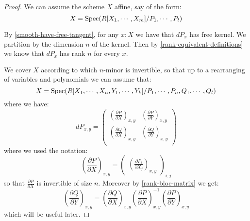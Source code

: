 \begin{proof}
We can assume the scheme $X$ affine, say of the form:
\[X = \operatorname{Spec}(R[X_1,\cdots,X_m]/P_1,\cdots,P_l)\]

By \cref{smooth-have-free-tangent}, for any $x:X$ we have that $dP_x$ has free kernel. We partition by the dimension $n$ of the kernel. Then by \cref{rank-equivalent-definitions} we know that $dP_x$ has rank $n$ for every $x$.

We cover $X$ according to which $n$-minor is invertible, so that up to a rearranging of variables and polynomials we can assume that:
\[X = \operatorname{Spec}(R[X_1,\cdots,X_n,Y_1,\cdots,Y_k]/P_1,\cdots,P_n,Q_1,\cdots, Q_l)\]
where we have:
\[dP_{x,y} = \begin{pmatrix}
\left(\frac{\partial P}{\partial X}\right)_{x,y} & \left(\frac{\partial P}{\partial Y}\right)_{x,y} \\
\left(\frac{\partial Q}{\partial X}\right)_{x,y} & \left(\frac{\partial Q}{\partial Y}\right)_{x,y} \\
\end{pmatrix}\]
where we used the notation:
\[\left(\frac{\partial P}{\partial X}\right)_{x,y} = \begin{pmatrix}\left(\frac{\partial P_i}{\partial X_j}\right)_{x,y}\end{pmatrix}_{i,j}\]
so that $\frac{\partial P}{\partial X}$ is invertible of size $n$. Moreover by \cref{rank-bloc-matrix} we get:
\[\left(\frac{\partial Q}{\partial Y}\right)_{x,y} = \left(\frac{\partial Q}{\partial X}\right)_{x,y}\left(\frac{\partial P}{\partial X}\right)_{x,y}^{-1} \left(\frac{\partial P}{\partial Y}\right)_{x,y} \]
which will be useful later.


\end{proof}
